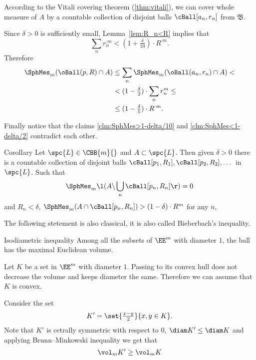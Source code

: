 According to the Vitali covering theorem (\ref{thm:vitali}), we can cover whole measure of $A$ by a countable collection of disjoint balls $\cBall[a_n,r_n]$ from $\mathfrak B$. 

Since $\delta>0$ is sufficiently small,
Lemma~\ref{lem:R_n<R} implies that
\[\sum_n r_n^{\cdot m}<(1+\tfrac{\delta}{10})\cdot R^{\cdot m}.\]
Therefore
\begin{align*}
\SphMes_m(\oBall(p,R)\cap A)
&\le\sum_n\SphMes_m(\oBall(a_n,r_n)\cap A)
<
\\
&<(1-\tfrac{\delta}{2})\cdot\sum_n r_n^m
\le
\\
&\le (1-\tfrac{\delta}{5})\cdot R^{\cdot m}.
\end{align*}
\claimqedsf

Finally notice that the claims \ref{clm:SphMes>1-delta/10} and \ref{clm:SphMes<1-delta/2} contradict each other.
\qeds

\begin{thm}{Corollary}
Let $\spc{L}\in\CBB{m}{}$
and $A\subset \spc{L}$.
Then given $\delta>0$ there is a countable collection of disjoint balls
$\cBall[p_1,R_1],\cBall[p_2,R_2],\dots$ in $\spc{L}$.
Such that 
\[\SphMes_m \l(A\backslash \bigcup_n\cBall[p_n,R_n]\r)=0\]
and 
$R_n<\delta$,
$\SphMes_m (A\cap \cBall[p_n,R_n])>(1-\delta)\cdot R^m$ 
for any $n$,

\end{thm}













The following stetement is also classical,
it is also called Bieberbach's inequality.

\begin{thm}{Isodiametric inequality}\label{prop:bieberbach-ball}
Among all the subsets of $\EE^m$ with diameter $1$,
the ball has the maximal Euclidean volume.
\end{thm}


Let $K$ be a set in $\EE^m$ with diameter $1$.
Passing to its convex hull does not decrease the volume and keeps diameter the same.
Therefore we can assume that $K$ is convex.

Consider the set 
\[K'=\set{\tfrac{x-y}2}{x,y\in K}.\]
Note that $K'$ is cetrally symmetric with respect to $0$,
$\diam K'\le \diam K$ and 
applying Brunn--Minkowski inequality we get that
\[\vol_m K'\ge \vol_m K\]

